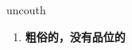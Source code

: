 
\begin{frame}
{\huge uncouth}
\begin{center}
\begin{enumerate}\Large
  \item \textbf{粗俗的，没有品位的}
\end{enumerate}
\end{center}
\end{frame}
